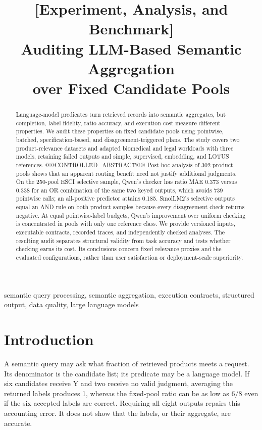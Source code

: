 \documentclass[conference]{IEEEtran}
\begin{document}
\title{[Experiment, Analysis, and Benchmark]\\Auditing LLM-Based Semantic Aggregation\\over Fixed Candidate Pools}
\author{}
\maketitle
\begin{abstract}
Language-model predicates turn retrieved records into semantic aggregates, but completion, label fidelity, ratio accuracy, and execution cost measure different properties. We audit these properties on fixed candidate pools using pointwise, batched, specification-based, and disagreement-triggered plans. The study covers two product-relevance datasets and adapted biomedical and legal workloads with three models, retaining failed outputs and simple, supervised, embedding, and LOTUS references. @@CONTROLLED_ABSTRACT@@ Post-hoc analysis of 302 product pools shows that an apparent routing benefit need not justify additional judgments. On the 250-pool ESCI selective sample, Qwen's checker has ratio MAE 0.373 versus 0.338 for an OR combination of the same two keyed outputs, which avoids 739 pointwise calls; an all-positive predictor attains 0.185. SmolLM2's selective outputs equal an AND rule on both product samples because every disagreement check returns negative. At equal pointwise-label budgets, Qwen's improvement over uniform checking is concentrated in pools with only one reference class. We provide versioned inputs, executable contracts, recorded traces, and independently checked analyses. The resulting audit separates structural validity from task accuracy and tests whether checking earns its cost. Its conclusions concern fixed relevance proxies and the evaluated configurations, rather than user satisfaction or deployment-scale superiority.

\end{abstract}
\begin{IEEEkeywords}
semantic query processing, semantic aggregation, execution contracts, structured output, data quality, large language models
\end{IEEEkeywords}

\section{Introduction}
A semantic query may ask what fraction of retrieved products meets a request. Its denominator is the candidate list; its predicate may be a language model. If six candidates receive Y and two receive no valid judgment, averaging the returned labels produces 1, whereas the fixed-pool ratio can be as low as $6/8$ even if the six accepted labels are correct. Requiring all eight outputs repairs this accounting error. It does not show that the labels, or their aggregate, are accurate.
\end{document}

